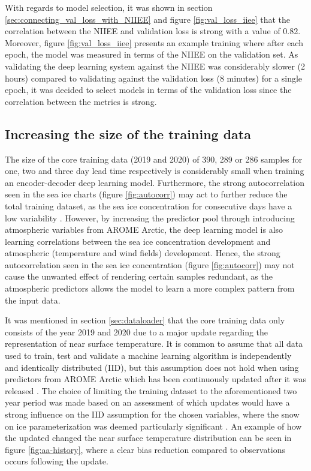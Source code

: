 \documentclass[../main/thesis]{subfiles}
\begin{document}
With regards to model selection, it was shown in section \ref{sec:connecting_val_loss_with_NIIEE} and figure \ref{fig:val_loss_iiee} that the correlation between the NIIEE and validation loss is strong with a value of 0.82. Moreover, figure \ref{fig:val_loss_iiee} presents an example training where after each epoch, the model was measured in terms of the NIIEE on the validation set. As validating the deep learning system against the NIIEE was considerably slower (2 hours) compared to validating against the validation loss (8 minutes) for a single epoch, it was decided to select models in terms of the validation loss since the correlation between the metrics is strong.

\subsection{Increasing the size of the training data}
\label{sec:increase_data}
The size of the core training data (2019 and 2020) of 390, 289 or 286 samples for one, two and three day lead time respectively is considerably small when training an encoder-decoder deep learning model. Furthermore, the strong autocorrelation seen in the sea ice charts (figure \ref{fig:autocorr}) may act to further reduce the total training dataset, as the sea ice concentration for consecutive days have a low variability \citep{Fritzner2020}. However, by increasing the predictor pool through introducing atmospheric variables from AROME Arctic, the deep learning model is also learning correlations between the sea ice concentration development and atmospheric (temperature and wind fields) development. Hence, the strong autocorrelation seen in the sea ice concentration (figure \ref{fig:autocorr}) may not cause the unwanted effect of rendering certain samples redundant, as the atmospheric predictors allows the model to learn a more complex pattern from the input data.

It was mentioned in section \ref{sec:dataloader} that the core training data only consists of the year 2019 and 2020 due to a major update regarding the representation of near surface temperature. It is common to assume that all data used to train, test and validate a machine learning algorithm is independently and identically distributed (IID), but this assumption does not hold when using predictors from AROME Arctic which has been continuously updated after it was released \citep{Mueller2017}. The choice of limiting the training dataset to the aforementioned two year period was made based on an assessment of which updates would have a strong influence on the IID assumption for the chosen variables, where the snow on ice parameterization was deemed particularly significant \citep{Batrak2019}. An example of how the updated changed the near surface temperature distribution can be seen in figure \ref{fig:aa-history}, where a clear bias reduction compared to observations occurs following the update.
\end{document}
